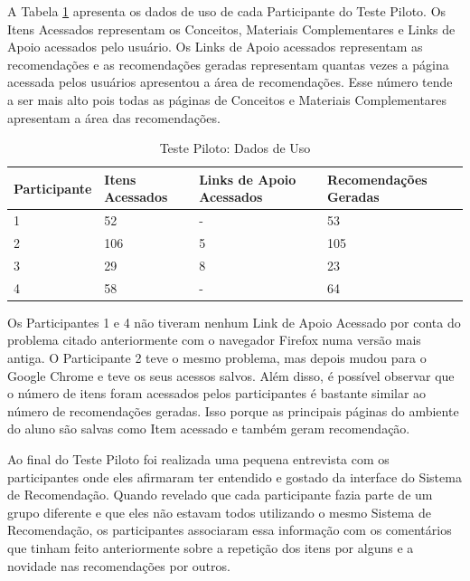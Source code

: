 A Tabela \ref{tab:teste-piloto-dados-de-uso} apresenta os dados de uso de cada Participante do Teste Piloto. Os Itens Acessados
representam os Conceitos, Materiais Complementares e Links de Apoio acessados pelo usuário. Os Links de Apoio acessados
representam as recomendações e as recomendações geradas representam quantas vezes a página acessada pelos usuários apresentou
a área de recomendações. Esse número tende a ser mais alto pois todas as páginas de Conceitos e Materiais Complementares
apresentam a área das recomendações.

\begin{table}[h]
\footnotesize
\caption[Teste Piloto: Dados de Uso]{Teste Piloto: Dados de Uso}
\label{tab:teste-piloto-dados-de-uso}
\centering
\begin{tabular}{|p{2cm}|p{3cm}|p{3cm}|p{3cm}|}
  \hline
  \textbf{Participante} & \textbf{Itens Acessados} & \textbf{Links de Apoio Acessados} & \textbf{Recomendações Geradas} \\
  \hline
  1            & 52              & -                        & 53                    \\
  \hline
  2            & 106             & 5                        & 105                   \\
  \hline
  3            & 29              & 8                        & 23                    \\
  \hline
  4            & 58              & -                        & 64                    \\
  \hline
\end{tabular}
\end{table}

Os Participantes 1 e 4 não tiveram nenhum Link de Apoio Acessado por conta do problema citado anteriormente com o navegador
Firefox numa versão mais antiga. O Participante 2 teve o mesmo problema, mas depois mudou para o Google Chrome e teve os
seus acessos salvos. Além disso, é possível observar que o número de itens foram acessados pelos participantes é bastante
similar ao número de recomendações geradas. Isso porque as principais páginas do ambiente do aluno são salvas como Item acessado
e também geram recomendação.

Ao final do Teste Piloto foi realizada uma pequena entrevista com os participantes onde eles afirmaram ter entendido e gostado
da interface do Sistema de Recomendação. Quando revelado que cada participante fazia parte de um grupo diferente e que eles
não estavam todos utilizando o mesmo Sistema de Recomendação, os participantes associaram essa informação com os
comentários que tinham feito anteriormente sobre a repetição dos itens por alguns e a novidade nas recomendações por outros.

